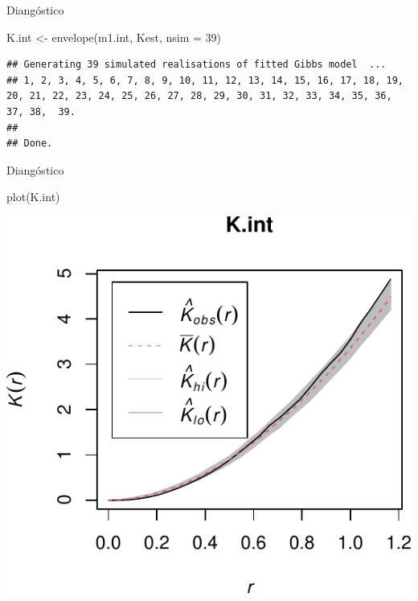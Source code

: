 \documentclass[
  11pt,
  ignorenonframetext,
]{beamer}
\newenvironment{Shaded}{}{}
\newcommand{\AttributeTok}[1]{\textcolor[rgb]{0.49,0.56,0.16}{#1}}
\newcommand{\DecValTok}[1]{\textcolor[rgb]{0.25,0.63,0.44}{#1}}
\newcommand{\FunctionTok}[1]{\textcolor[rgb]{0.02,0.16,0.49}{#1}}
\newcommand{\NormalTok}[1]{#1}
\newcommand{\OtherTok}[1]{\textcolor[rgb]{0.00,0.44,0.13}{#1}}
\begin{document}
\begin{frame}[fragile]{Diangóstico}
\protect\hypertarget{dianguxf3stico}{}
\begin{Shaded}
\begin{Highlighting}[]
\NormalTok{K.int }\OtherTok{\textless{}{-}} \FunctionTok{envelope}\NormalTok{(m1.int, Kest, }\AttributeTok{nsim =} \DecValTok{39}\NormalTok{)}
\end{Highlighting}
\end{Shaded}

\begin{verbatim}
## Generating 39 simulated realisations of fitted Gibbs model  ...
## 1, 2, 3, 4, 5, 6, 7, 8, 9, 10, 11, 12, 13, 14, 15, 16, 17, 18, 19, 20, 21, 22, 23, 24, 25, 26, 27, 28, 29, 30, 31, 32, 33, 34, 35, 36, 37, 38,  39.
## 
## Done.
\end{verbatim}
\end{frame}

\begin{frame}[fragile]{Diangóstico}
\protect\hypertarget{dianguxf3stico-1}{}
\begin{Shaded}
\begin{Highlighting}[]
\FunctionTok{plot}\NormalTok{(K.int)}
\end{Highlighting}
\end{Shaded}

\begin{center}\includegraphics{Tutorial-spatstat-2_files/figure-beamer/unnamed-chunk-33-1} \end{center}
\end{frame}
\end{document}
